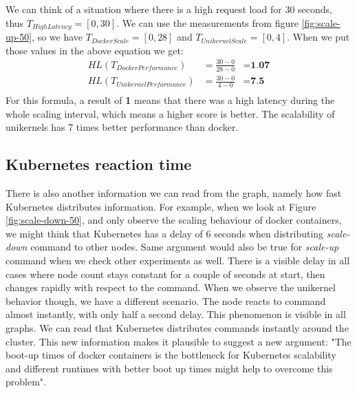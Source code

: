We can think of a situation where there is a high request load for 30 seconds, thus \(T_{HighLatency}=[0,30]\). We can use the measurements from figure \ref{fig:scale-up-50}, so we have \(T_{DockerScale}=[0,28]\) and \(T_{UnikernelScale}=[0,4]\). When we put those values in the above equation we get:
\begin{equation*}
  \begin{aligned}
  HL(T_{DockerPerformance})&=\frac{30-0}{28-0}&=\textbf{1.07} \\
  HL(T_{UnikernelPerformance})&=\frac{30-0}{4-0}&=\textbf{7.5} \\
  \end{aligned}
\end{equation*}
For this formula, a result of \textbf{1} means that there was a high latency during the whole scaling interval, which means a higher score is better. The scalability of unikernels has 7 times better performance than docker.


\subsection{Kubernetes reaction time}
There is also another information we can read from the graph, namely how fast Kubernetes distributes information. For example, when we look at Figure \ref{fig:scale-down-50}, and only observe the scaling behaviour of docker containers, we might think that Kubernetes has a delay of 6 seconds when distributing \textit{scale-down} command to other nodes. Same argument would also be true for \textit{scale-up} command when we check other experiments as well. There is a visible delay in all cases where node count stays constant for a couple of seconds at start, then changes rapidly with respect to the command. When we observe the unikernel behavior though, we have a different scenario. The node reacts to command almost instantly, with only half a second delay. This phenomenon is visible in all graphs. We can read that Kubernetes distributes commands instantly around the cluster. This new information makes it plausible to suggest a new argument: "The boot-up times of docker containers is the bottleneck for Kubernetes scalability and different runtimes with better boot up times might help to overcome this problem".


  
